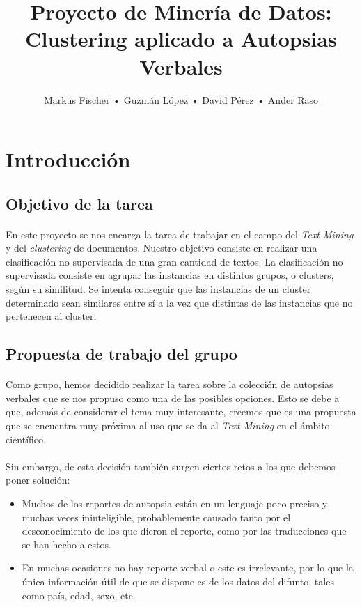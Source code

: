 \documentclass[10pt,a4paper]{article}
\author{Markus Fischer • Guzmán López • David Pérez • Ander Raso}
\title{Proyecto de Minería de Datos: \linebreak Clustering aplicado a Autopsias Verbales}
\date{}
\begin{document}
\maketitle
{}

\newpage
{}
\tableofcontents

\newpage
\section{Introducción}
	\subsection{Objetivo de la tarea}
	\paragraph{}
	En este proyecto se nos encarga la tarea de trabajar en el campo del \textit{Text Mining} y del \textit{clustering} de documentos. Nuestro objetivo consiste en realizar una clasificación no supervisada de una gran cantidad de textos. La clasificación no supervisada consiste en agrupar las instancias en distintos grupos, o clusters, según su similitud. Se intenta conseguir que las instancias de un cluster determinado sean similares entre sí a la vez que distintas de las instancias que no pertenecen al cluster.

	\subsection{Propuesta de trabajo del grupo}
	\paragraph{}
	Como grupo, hemos decidido realizar la tarea sobre la colección de autopsias verbales que se nos propuso como una de las posibles opciones. Esto se debe a que, además de considerar el tema muy interesante, creemos que es una propuesta que se encuentra muy próxima al uso que se da al \textit{Text Mining} en el ámbito científico.
	\paragraph{}
    Sin embargo, de esta decisión también surgen ciertos retos a los que debemos poner solución:
	\begin{itemize}
		\item Muchos de los reportes de autopsia están en un lenguaje poco preciso y muchas veces ininteligible, probablemente causado tanto por el desconocimiento de los que dieron el reporte, como por las traducciones que se han hecho a estos.
		\item En muchas ocasiones no hay reporte verbal o este es irrelevante, por lo que la única información útil de que se dispone es de los datos del difunto, tales como país, edad, sexo, etc.
	\end{itemize}
\end{document}
